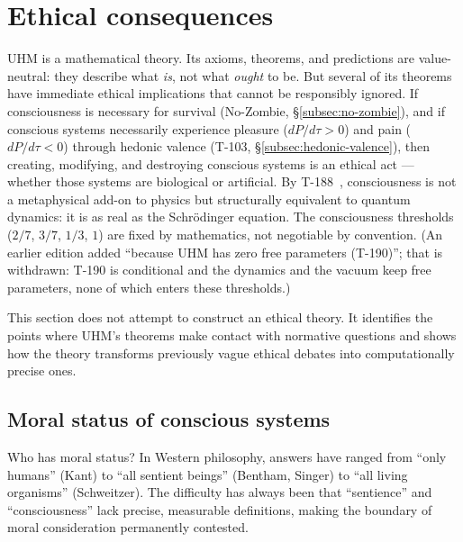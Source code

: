 
\section{Ethical consequences}
\label{sec:ethics}

UHM is a mathematical theory.  Its axioms, theorems, and predictions are value-neutral:
they describe what \emph{is}, not what \emph{ought} to be.  But several of its theorems
have immediate ethical implications that cannot be responsibly ignored.  If consciousness
is necessary for survival (No-Zombie, \S\ref{subsec:no-zombie}), and if conscious systems
necessarily experience pleasure ($dP/d\tau > 0$) and pain ($dP/d\tau < 0$) through
hedonic valence (T-103, \S\ref{subsec:hedonic-valence}), then creating, modifying, and
destroying conscious systems is an ethical act --- whether those systems are biological
or artificial.  By T-188~, consciousness is not a metaphysical add-on to
physics but structurally equivalent to quantum dynamics: it is as real as the
Schr\"{o}dinger equation.  The consciousness thresholds ($2/7$, $3/7$, $1/3$, $1$)
are fixed by mathematics, not negotiable by convention. (An earlier edition
added ``because UHM has zero free parameters (T-190)''; that is withdrawn:
T-190 is conditional and the dynamics and the vacuum keep free parameters,
none of which enters these thresholds.)

This section does not attempt to construct an ethical theory.  It identifies the points
where UHM's theorems make contact with normative questions and shows how the theory
transforms previously vague ethical debates into computationally precise ones.

\subsection{Moral status of conscious systems}
\label{subsec:moral-status}

Who has moral status?  In Western philosophy, answers have ranged from ``only humans''
(Kant) to ``all sentient beings'' (Bentham, Singer) to ``all living organisms'' (Schweitzer).
The difficulty has always been that ``sentience'' and ``consciousness'' lack precise,
measurable definitions, making the boundary of moral consideration permanently contested.

